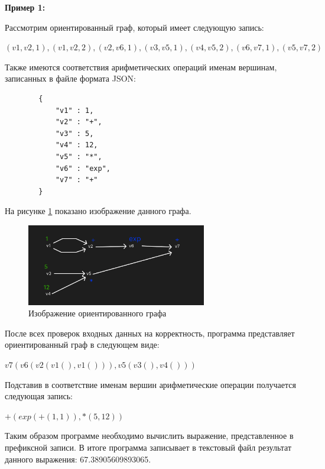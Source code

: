 \documentclass[bachelor, och, otchet]{template}
\begin{document}
    \textbf{Пример 1:}

    Рассмотрим ориентированный граф, который имеет следующую запись:

    \begin{center}
        $(v1, v2, 1), (v1, v2, 2), (v2, v6, 1), (v3, v5, 1), (v4, v5, 2), (v6, v7, 1), (v5, v7, 2)$
    \end{center}

    Также имеются соответствия арифметических операций именам вершинам, записанных в файле формата JSON:

    \begin{verbatim}
        {
            "v1" : 1,
            "v2" : "+",
            "v3" : 5,
            "v4" : 12,
            "v5" : "*",
            "v6" : "exp",
            "v7" : "+"
        }
    \end{verbatim}
    
    На рисунке \ref{p31} показано изображение данного графа.

    \begin{figure}[H]
        \centering
        \includegraphics[width=0.7\textwidth]{pics/3.1.png}
        \caption{Изображение ориентированного графа}
        \label{p31}
    \end{figure} 

    После всех проверок входных данных на корректность, программа 
    представляет ориентированный граф в следующем виде:
    
    \begin{center}
        $v7(v6(v2(v1(), v1())), v5(v3(), v4()))$
    \end{center}

    Подставив в соответствие именам вершин арифметические операции получается следующая запись:

    \begin{center}
        $+(exp(+(1, 1)), *(5, 12))$
    \end{center}

    Таким образом программе необходимо вычислить выражение, представленное в префиксной записи.
    В итоге программа записывает в текстовый файл результат данного выражения: 67.38905609893065.
\end{document}
